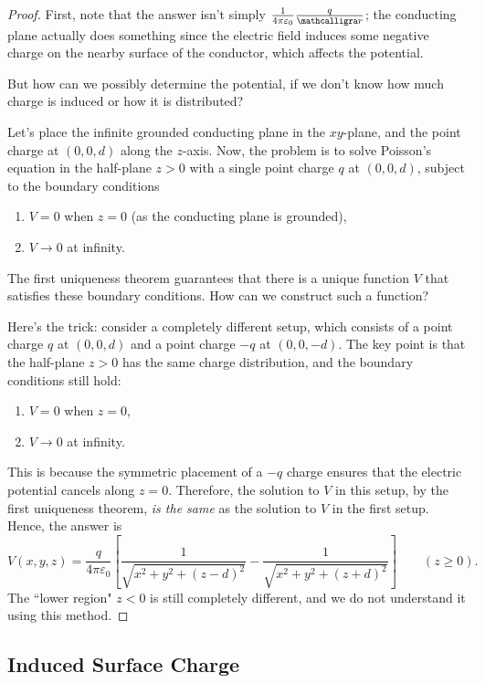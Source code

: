 \begin{proof}
First, note that the answer isn't simply $\frac{1}{4\pi\varepsilon_0}\frac{q}{\scr}$; the conducting plane actually does something since the electric field induces some negative charge on the nearby surface of the conductor, which affects the potential.

But how can we possibly determine the potential, if we don't know how much charge is induced or how it is distributed?

Let's place the infinite grounded conducting plane in the $xy$-plane, and the point charge at $(0,0,d)$ along the $z$-axis. Now, the problem is to solve Poisson's equation in the half-plane $z>0$ with a single point charge $q$ at $(0,0,d)$, subject to the boundary conditions
\begin{enumerate}
    \item $V=0$ when $z=0$ (as the conducting plane is grounded),
    \item $V\to 0$ at infinity.
\end{enumerate}
The first uniqueness theorem guarantees that there is a unique function $V$ that satisfies these boundary conditions. How can we construct such a function?

Here's the trick: consider a completely different setup, which consists of a point charge $q$ at $(0,0,d)$ and a point charge $-q$ at $(0,0,-d)$. The key point is that the half-plane $z>0$ has the same charge distribution, and the boundary conditions still hold:
\begin{enumerate}
    \item $V=0$ when $z=0$,
    \item $V\to 0$ at infinity.
\end{enumerate}
This is because the symmetric placement of a $-q$ charge ensures that the electric potential cancels along $z=0$. Therefore, the solution to $V$ in this setup, by the first uniqueness theorem, \textit{is the same} as the solution to $V$ in the first setup. Hence, the answer is
\[V(x,y,z)=\frac{q}{4\pi\varepsilon_0}\left[\frac{1}{\sqrt{x^2+y^2+(z-d)^2}}-\frac{1}{\sqrt{x^2+y^2+(z+d)^2}}\right] \qquad (z\ge 0).\]
The ``lower region" $z<0$ is still completely different, and we do not understand it using this method.
\end{proof}

\subsection{Induced Surface Charge}

